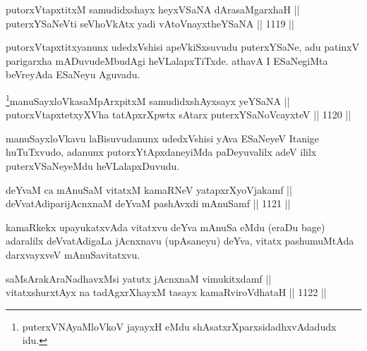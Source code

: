 
\begin{shl}
putorxVtapxtitxM samudidxshayx heyxVSaNA dArasaMgarxhaH || \\
puterxYSaNeVti seVhoVkAtx yadi vA\s toV\s nayxtheYSaNA \hfill || 1119 ||  
\end{shl}

\begin{artha}
putorxVtapxtitxyanunx udedxVshisi apeVkiSxsuvudu puterxYSaNe, adu patinxV parigarxha mADuvudeMbudAgi heVLalapxTiTxde. athavA I ESaNegiMta beVreyAda ESaNeyu Aguvadu.
\end{artha}



\begin{shl}
\footnote{puterxVNAyaMloVkoV jayayxH eMdu shAsatxrXparxsidadhxvAdadudx idu.}manuSayxloVkasaMpArxpitxM samudidxshAyxsayx yeYSaNA || \\
putorxVtapxtetxyXVha tatApxrXpwtx sA\s tarx puterxYSaNoVcayxteV \hfill || 1120 ||  
\end{shl}

\begin{artha}
manuSayxloVkavu laBisuvudanunx udedxVshisi yAva ESaNeyeV Itanige huTuTxvudo, adanunx putorxYtApxdaneyiMda paDeyuvalilx adeV ililx puterxVSaNeyeMdu heVLalapxDuvudu.
\end{artha}


\begin{shl}
deYvaM ca mAnuSaM vitatxM kamaRNeV yatapxrXyoVjakamf ||  \\
deVvatAdiparijAcnxnaM deYvaM pashAvxdi mAnuSamf \hfill || 1121 ||  
\end{shl}

\begin{artha}
kamaRkekx upayukatxvAda vitatxvu deYva mAnuSa eMdu (eraDu bage) adaralilx deVvatAdigaLa jAcnxnavu (upAsaneyu) deYva, vitatx pashumuMtAda darxvayxveV mAnuSavitatxvu.
\end{artha}


\begin{shl}
saMsArakAraNadhavxMsi yatutx jAcnxnaM vimukitxdamf || \\
vitatxshurxtAyx na tadAgxrXhayxM tasayx kamaRviroVdhataH \hfill || 1122 ||  
\end{shl}

